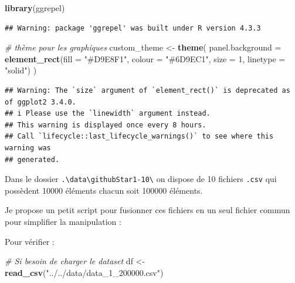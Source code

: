 \documentclass[
]{article}
\newenvironment{Shaded}{\begin{snugshade}}{\end{snugshade}}
\newcommand{\AttributeTok}[1]{\textcolor[rgb]{0.13,0.29,0.53}{#1}}
\newcommand{\CommentTok}[1]{\textcolor[rgb]{0.56,0.35,0.01}{\textit{#1}}}
\newcommand{\DecValTok}[1]{\textcolor[rgb]{0.00,0.00,0.81}{#1}}
\newcommand{\FunctionTok}[1]{\textcolor[rgb]{0.13,0.29,0.53}{\textbf{#1}}}
\newcommand{\NormalTok}[1]{#1}
\newcommand{\OtherTok}[1]{\textcolor[rgb]{0.56,0.35,0.01}{#1}}
\newcommand{\StringTok}[1]{\textcolor[rgb]{0.31,0.60,0.02}{#1}}
\begin{document}
\begin{Shaded}
\begin{Highlighting}[]
\FunctionTok{library}\NormalTok{(ggrepel)}
\end{Highlighting}
\end{Shaded}

\begin{verbatim}
## Warning: package 'ggrepel' was built under R version 4.3.3
\end{verbatim}

\begin{Shaded}
\begin{Highlighting}[]
\CommentTok{\# thème pour les graphiques}
\NormalTok{custom\_theme }\OtherTok{\textless{}{-}} \FunctionTok{theme}\NormalTok{(}
        \AttributeTok{panel.background =} \FunctionTok{element\_rect}\NormalTok{(}\AttributeTok{fill =} \StringTok{"\#D9E8F1"}\NormalTok{,}
                                        \AttributeTok{colour =} \StringTok{"\#6D9EC1"}\NormalTok{,}
                                        \AttributeTok{size =} \DecValTok{1}\NormalTok{, }\AttributeTok{linetype =} \StringTok{"solid"}\NormalTok{)}
\NormalTok{)}
\end{Highlighting}
\end{Shaded}

\begin{verbatim}
## Warning: The `size` argument of `element_rect()` is deprecated as of ggplot2 3.4.0.
## i Please use the `linewidth` argument instead.
## This warning is displayed once every 8 hours.
## Call `lifecycle::last_lifecycle_warnings()` to see where this warning was
## generated.
\end{verbatim}

Dans le dossier
\texttt{.\textbackslash{}data\textbackslash{}githubStar1-10\textbackslash{}}
on dispose de 10 fichiers \texttt{.csv} qui possèdent 10000 éléments
chacun soit 100000 éléments.

Je propose un petit script pour fusionner ces fichiers en un seul
fichier commun pour simplifier la manipulation :

Pour vérifier :

\begin{Shaded}
\begin{Highlighting}[]
\CommentTok{\# Si besoin de charger le dataset}
\NormalTok{df }\OtherTok{\textless{}{-}} \FunctionTok{read\_csv}\NormalTok{(}\StringTok{"../../data/data\_1\_200000.csv"}\NormalTok{)}
\end{Highlighting}
\end{Shaded}
\end{document}
